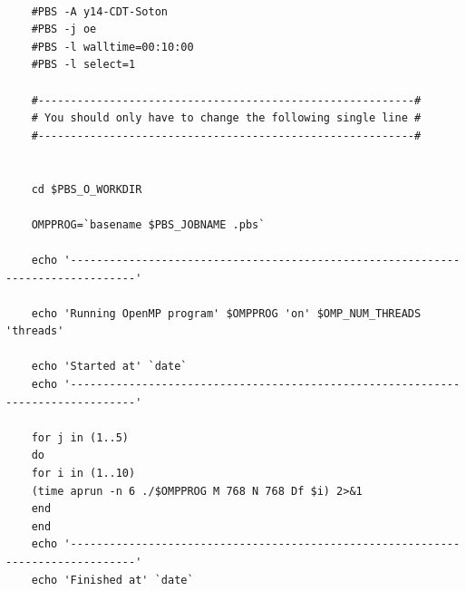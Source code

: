 \documentclass[11pt]{article}
\begin{document}
	\begin{lstlisting}
	
	#PBS -A y14-CDT-Soton
	#PBS -j oe
	#PBS -l walltime=00:10:00
	#PBS -l select=1
	
	#----------------------------------------------------------#
	# You should only have to change the following single line #
	#----------------------------------------------------------#
	
	
	cd $PBS_O_WORKDIR
	
	OMPPROG=`basename $PBS_JOBNAME .pbs`
	
	echo '--------------------------------------------------------------------------------'
	
	echo 'Running OpenMP program' $OMPPROG 'on' $OMP_NUM_THREADS 'threads'
	
	echo 'Started at' `date`
	echo '--------------------------------------------------------------------------------'
	
	for j in (1..5)
	do
	for i in (1..10)
	(time aprun -n 6 ./$OMPPROG M 768 N 768 Df $i) 2>&1
	end
	end
	echo '--------------------------------------------------------------------------------'
	echo 'Finished at' `date`
	\end{lstlisting}
	\pagebreak
\end{document}

